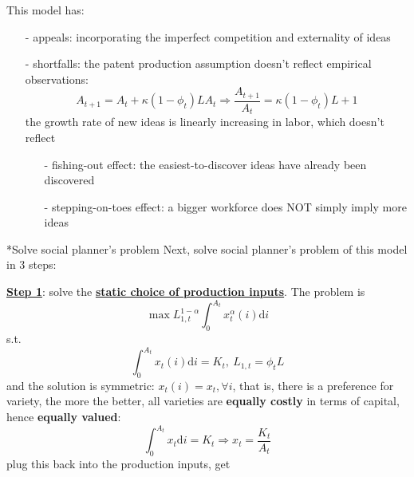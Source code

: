 \documentclass[10pt,landscape,a4paper]{article}
\makeatletter
\renewcommand{\subsubsection}{\@startsection{subsubsection}{1}{0mm}{.2ex}{.2ex}{\bfseries}}
\makeatother
\begin{document}
\begin{multicols*}{3}
\vspace{2pt}
This model has:
\begin{itemize}
    \item[-] appeals: incorporating the imperfect competition and externality of ideas

    \item[-] shortfalls: the patent production assumption doesn't reflect empirical observations:
    $$ A_{t+1} = A_t+\kappa (1-\phi_t)L A_t\Rightarrow \frac{A_{t+1}}{A_t}= \kappa (1-\phi_t)L+1$$
    the growth rate of new ideas is linearly increasing in labor, which doesn't reflect
    \begin{itemize}
        \item[-] fishing-out effect: the easiest-to-discover ideas have already been discovered
        \item[-] stepping-on-toes effect: a bigger workforce does NOT simply imply more ideas
    \end{itemize}
\end{itemize}

\subsubsection*{Solve social planner's problem}
Next, solve social planner's problem of this model in 3 steps:

\vspace{2pt}
\underline{\textbf{Step 1}}: solve the \textbf{\color{myred}\underline{static choice of production inputs}}. The problem is 
$$\max L_{1,t}^{1-\alpha}\int^{A_t}_0 x_t^{\alpha}(i)\mathrm{d}i
$$
s.t.
$$
\int^{A_t}_0 x_t(i)\mathrm{d}i=K_t,\ L_{1,t}=\phi_tL
$$
and the solution is symmetric: $x_t(i)=x_t,\forall i$, that is, there is a preference for variety, the more the better, all varieties are \textbf{equally costly} in terms of capital, hence \textbf{equally valued}:
$$
\int^{A_t}_0 x_t\mathrm{d}i=K_t\Rightarrow x_t = \frac{K_t}{A_t}
$$
plug this back into the production inputs, get

\vspace{2pt}
\end{multicols*}
\end{document}
